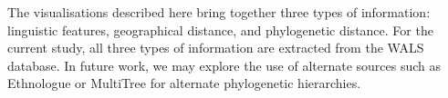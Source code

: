 \documentclass[11pt]{article}
\begin{document}
The visualisations described here bring together three types of information: linguistic features, geographical distance, and phylogenetic distance. For the current study, all three types of information are extracted from the WALS database. In future work, we may explore the use of alternate sources such as Ethnologue \cite{ethnologue} or MultiTree  for alternate phylogenetic hierarchies. 





\end{document}
